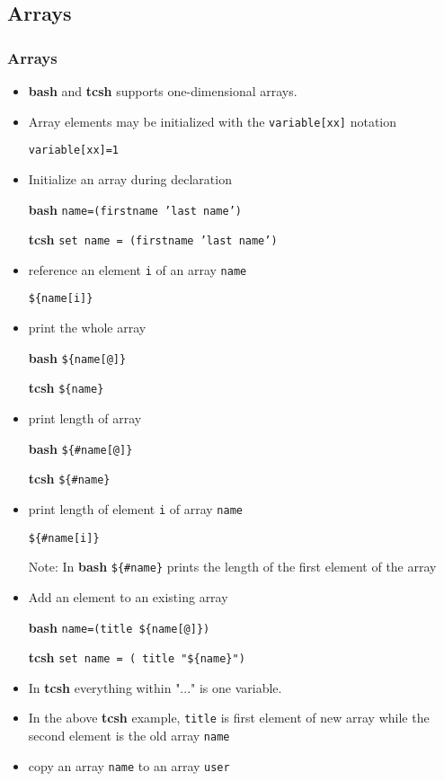 \documentclass[slidestop,mathserif,compress,xcolor=svgnames]{beamer}
\begin{document}
\subsection{Arrays}
\begin{frame}
  \frametitle{\small Arrays}
  \begin{itemize}
    \item \textbf{bash} and \textbf{tcsh} supports one-dimensional arrays.
    \item Array elements may be initialized with the \texttt{variable[xx]} notation
    \item[] \texttt{variable[xx]=1}
    \item Initialize an array during declaration
    \item[\textbf{bash}] \texttt{name=(firstname 'last name')}
    \item[\textbf{tcsh}] \texttt{set name = (firstname 'last name')}
    \item reference an element \texttt{i} of an array \texttt{name}
    \item[] \texttt{\$\{name[i]\}}
    \item print the whole array
    \item[\textbf{bash}] \texttt{\$\{name[@]\}}
    \item[\textbf{tcsh}] \texttt{\$\{name\}}
    \item print length of array
    \item[\textbf{bash}] \texttt{\$\{\#name[@]\}}
    \item[\textbf{tcsh}] \texttt{\$\{\#name\}}
    \item print length of element \texttt{i} of array \texttt{name}
    \item[] \texttt{\$\{\#name[i]\}}
    \item[] Note: In \textbf{bash} \texttt{\$\{\#name\}} prints the length of the first element of the array
    \item Add an element to an existing array
    \item[\textbf{bash}] \texttt{name=(title \$\{name[@]\})}
    \item[\textbf{tcsh}] \texttt{set name = ( title  "\$\{name\}")}
    \item In \textbf{tcsh} everything within "..." is one variable.
    \item In the above \textbf{tcsh} example, \texttt{title} is first element of new array while the second element is the old array \texttt{name}
    \item copy an array \texttt{name} to an array \texttt{user}

\end{itemize}
\end{frame}
\end{document}
